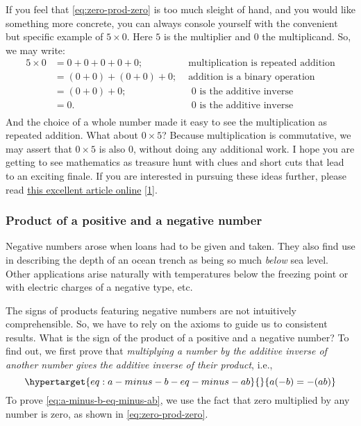 \documentclass[
  a4paper,
]{article}
\begin{document}
If you feel that \cref{eq:zero-prod-zero} is too much sleight of hand,
and you would like something more concrete, you can always console
yourself with the convenient but specific example of \(5 \times 0\).
Here \(5\) is the multiplier and \(0\) the multiplicand. So, we may
write: \[
\begin{aligned}
5 \times 0 &= 0 + 0 + 0 + 0 + 0; & \text{ multiplication is repeated addition}\\
&= (0 + 0) + (0 + 0) + 0; & \text{ addition is a binary operation}\\
&= (0 + 0) + 0; & \text{ $0$ is the additive inverse}\\
&= 0. & \text{ $0$ is the additive inverse}\\
\end{aligned}
\] And the choice of a whole number made it easy to see the
multiplication as repeated addition. What about \(0 \times 5\)? Because
multiplication is commutative, we may assert that \(0 \times 5\) is also
\(0\), without doing any additional work. I hope you are getting to see
mathematics as treasure hunt with clues and short cuts that lead to an
exciting finale. If you are interested in pursuing these ideas further,
please read
\href{https://medium.com/swlh/why-a-0-0-and-other-proofs-of-the-obvious-da52dd0caefb}{this
excellent article online}
{[}\protect\hyperlink{ref-chodnicki2020}{1}{]}.

\hypertarget{product-of-a-positive-and-a-negative-number}{%
\subsubsection{Product of a positive and a negative
number}\label{product-of-a-positive-and-a-negative-number}}

Negative numbers arose when loans had to be given and taken. They also
find use in describing the depth of an ocean trench as being so much
\emph{below} sea level. Other applications arise naturally with
temperatures below the freezing point or with electric charges of a
negative type, etc.

The signs of products featuring negative numbers are not intuitively
comprehensible. So, we have to rely on the axioms to guide us to
consistent results. What is the sign of the product of a positive and a
negative number? To find out, we first prove that \emph{multiplying a
number by the additive inverse of another number gives the additive
inverse of their product}, i.e.,
\begin{equation}\protect\hypertarget{eq:a-minus-b-eq-minus-ab}{}{
a(-b) = -(ab)
}\label{eq:a-minus-b-eq-minus-ab}\end{equation} To prove
\cref{eq:a-minus-b-eq-minus-ab}, we use the fact that zero multiplied by
any number is zero, as shown in \cref{eq:zero-prod-zero}.
\end{document}
